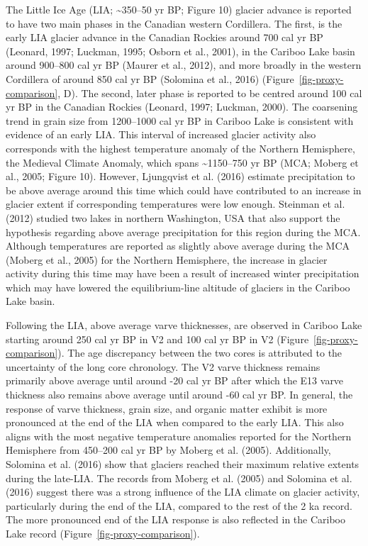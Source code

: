 \documentclass[
  letterpaper,
  DIV=11,
  numbers=noendperiod]{scrartcl}
\begin{document}
The Little Ice Age (LIA; \textasciitilde350--50 yr BP; Figure 10)
glacier advance is reported to have two main phases in the Canadian
western Cordillera. The first, is the early LIA glacier advance in the
Canadian Rockies around 700 cal yr BP (Leonard, 1997; Luckman, 1995;
Osborn et al., 2001), in the Cariboo Lake basin around 900--800 cal yr
BP (Maurer et al., 2012), and more broadly in the western Cordillera of
around 850 cal yr BP (Solomina et al., 2016)
(Figure~\ref{fig-proxy-comparison}, D). The second, later phase is
reported to be centred around 100 cal yr BP in the Canadian Rockies
(Leonard, 1997; Luckman, 2000). The coarsening trend in grain size from
1200--1000 cal yr BP in Cariboo Lake is consistent with evidence of an
early LIA. This interval of increased glacier activity also corresponds
with the highest temperature anomaly of the Northern Hemisphere, the
Medieval Climate Anomaly, which spans \textasciitilde1150--750 yr BP
(MCA; Moberg et al., 2005; Figure 10). However, Ljungqvist et al. (2016)
estimate precipitation to be above average around this time which could
have contributed to an increase in glacier extent if corresponding
temperatures were low enough. Steinman et al. (2012) studied two lakes
in northern Washington, USA that also support the hypothesis regarding
above average precipitation for this region during the MCA. Although
temperatures are reported as slightly above average during the MCA
(Moberg et al., 2005) for the Northern Hemisphere, the increase in
glacier activity during this time may have been a result of increased
winter precipitation which may have lowered the equilibrium-line
altitude of glaciers in the Cariboo Lake basin.

Following the LIA, above average varve thicknesses, are observed in
Cariboo Lake starting around 250 cal yr BP in V2 and 100 cal yr BP in V2
(Figure~\ref{fig-proxy-comparison}). The age discrepancy between the two
cores is attributed to the uncertainty of the long core chronology. The
V2 varve thickness remains primarily above average until around -20 cal
yr BP after which the E13 varve thickness also remains above average
until around -60 cal yr BP. In general, the response of varve thickness,
grain size, and organic matter exhibit is more pronounced at the end of
the LIA when compared to the early LIA. This also aligns with the most
negative temperature anomalies reported for the Northern Hemisphere from
450--200 cal yr BP by Moberg et al. (2005). Additionally, Solomina et
al. (2016) show that glaciers reached their maximum relative extents
during the late-LIA. The records from Moberg et al. (2005) and Solomina
et al. (2016) suggest there was a strong influence of the LIA climate on
glacier activity, particularly during the end of the LIA, compared to
the rest of the 2 ka record. The more pronounced end of the LIA response
is also reflected in the Cariboo Lake record
(Figure~\ref{fig-proxy-comparison}).
\end{document}
